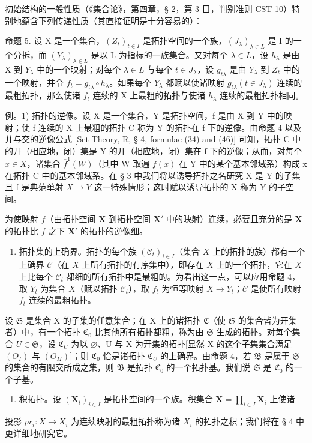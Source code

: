 初始结构的一般性质（《集合论》，第四章，§ 2，第 3 目，判别准则 CST 10）特别地蕴含下列传递性质（其直接证明是十分容易的）：

命题 5. 设 X 是一个集合，\((Z_{t})_{t\in I}\) 是拓扑空间的一个族，\((J_{\lambda})_{\lambda\in L}\) 是 I 的一个分拆，而 \((Y_{\lambda})_{\lambda\in L}\) 是以 L 为指标的一族集合。又对每个 \(\lambda\in L\)，设 \(h_{\lambda}\) 是由 X 到 \(Y_{\lambda}\) 中的一个映射；对每个 \(\lambda\in L\) 与每个 \(t\in J_{\lambda}\)，设 \(g_{t\lambda}\) 是由 \(Y_{\lambda}\) 到 \(Z_{t}\) 中的一个映射，并令 \(f_{t}=g_{t\lambda}\circ h_{\lambda}\)。如果每个 \(Y_{\lambda}\) 都赋以使诸映射 \(g_{t\lambda}(t\in J_{\lambda})\) 连续的最粗拓扑，那么使诸 \(f_{t}\) 连续的 X 上最粗的拓扑与使诸 \(h_{\lambda}\) 连续的最粗拓扑相同。

例。1) 拓扑的逆像。设 X 是一个集合，Y 是拓扑空间，f 是由 X 到 Y 中的映射；使 f 连续的 X 上最粗的拓扑 C 称为 Y 的拓扑在 f 下的逆像。由命题 4 以及并与交的逆像公式 {[}Set Theory, R, § 4, formulae (34) and (46){]} 可知，拓扑 C 中的开（相应地，闭）集是 Y 的开（相应地，闭）集在 f 下的逆像；从而，对每个 \(x \in X\)，诸集合 \(\overline{f}^{1}(W)\)（其中 W 取遍 \(f(x)\) 在 Y 中的某个基本邻域系）构成 x 在拓扑 C 中的基本邻域系。在 § 3 中我们将以诱导拓扑之名研究 X 是 Y 的子集且 f 是典范单射 \(X \to Y\) 这一特殊情形；这时赋以诱导拓扑的 X 称为 Y 的子空间。

为使映射 \(f\)（由拓扑空间 \(\mathbf{X}\) 到拓扑空间 \(\mathbf{X}'\) 中的映射）连续，必要且充分的是 \(\mathbf{X}\) 的拓扑比 \(f\) 之下 \(\mathbf{X}'\) 的拓扑的逆像细。

\begin{enumerate}
\def\labelenumi{\arabic{enumi})}
\setcounter{enumi}{1}
\tightlist
\item
  拓扑集的上确界。拓扑的每个族 \((\mathcal{C}_t)_{i\in I}\)（集合 \(X\) 上的拓扑的族）都有一个上确界 \(\mathcal{C}\)（在 \(X\) 上所有拓扑的有序集中），即存在 \(X\) 上的一个拓扑，它在 \(X\) 上比每个 \(\mathcal{C}_t\) 都细的所有拓扑中是最粗的。为看出这一点，可以应用命题 4，取 \(Y_t\) 为集合 \(X\)（赋以拓扑 \(\mathcal{C}_t\)），取 \(f_t\) 为恒等映射 \(X\to Y_t\)；\(\mathcal{C}\) 是使所有映射 \(f_t\) 连续的最粗拓扑。
\end{enumerate}

设 \(\mathfrak{S}\) 是集合 X 的子集的任意集合；在 X 上的诸拓扑 \(\mathfrak{C}\)（使 \(\mathfrak{S}\) 的集合皆为开集者）中，有一个拓扑 \(\mathfrak{C}_0\) 比其他所有拓扑都粗，称为由 \(\mathfrak{S}\) 生成的拓扑。对每个集合 \(U \in \mathfrak{S}\)，设 \(\mathfrak{C}_U\) 为以 \(\varnothing\)、U 与 X 为开集的拓扑{[}显然 X 的这个子集集合满足 \((O_I)\) 与 \((O_{II})]\)；则 \(\mathfrak{C}_0\) 恰是诸拓扑 \(\mathfrak{C}_U\) 的上确界。由命题 4，若 \(\mathfrak{B}\) 是属于 \(\mathfrak{S}\) 的集合的有限交所成之集，则 \(\mathfrak{B}\) 是拓扑 \(\mathfrak{C}_0\) 的一个拓扑基。我们说 \(\mathfrak{S}\) 是 \(\mathfrak{C}_0\) 的一个子基。

\begin{enumerate}
\def\labelenumi{\arabic{enumi})}
\setcounter{enumi}{2}
\tightlist
\item
  积拓扑。设 \((\mathbf{X}_t)_{i \in I}\) 是拓扑空间的一个族。积集合 \(\mathbf{X} = \prod_{i \in I} \mathbf{X}_i\) 上使诸
\end{enumerate}

投影 \(pr_{i}: X \rightarrow X_{i}\) 为连续映射的最粗拓扑称为诸 \(X_{i}\) 的拓扑之积；我们将在 § 4 中更详细地研究它。

